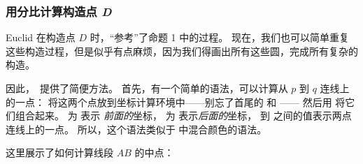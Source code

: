 \subsubsection{用分比计算构造点 \emph{D}}

\bohs

Euclid 在构造点 $D$ 时，“参考”了命题 1 中的过程。
现在，我们也可以简单重复这些构造过程，但是似乎有点麻烦，因为我们得画出所有这些圆，完成所有复杂的构造。

因此，\tikzname\ 提供了简便方法。
首先，有一个简单的语法，可以计算从 $p$ 到 $q$ 连线上的一点：
将这两个点放到坐标计算环境中——别忘了首尾的 \ltz{($} 和 \ltz{$)}——
然后用 \ltz{!}\ltz{!} 将它们组合起来。
 为  表示 \emph{前面的}坐标， 为  表示\emph{后面的}坐标， 到  之间的值表示两点连线上的一点。
所以，这个语法类似于  中混合颜色的语法。

这里展示了如何计算线段 $AB$ 的中点：

\eohs

\begin{codeexample}[]
\end{codeexample}

